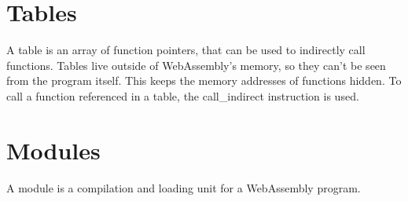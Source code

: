 \documentclass[10pt,a4paper]{article}
\begin{document}
\section*{Tables}

A table is an array of function pointers, that can be used to indirectly call functions. Tables live outside of WebAssembly's memory, so they can't be seen from the program itself. This keeps the memory addresses of functions hidden. To call a function referenced in a table, the \textsf{call\_indirect} instruction is used.

\section*{Modules}

A module is a compilation and loading unit for a WebAssembly program.
\end{document}

